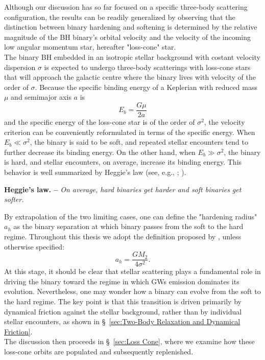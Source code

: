 \documentclass[12pt,twoside,openany]{book}
\begin{document}
\par\vspace{0.5cm}
\noindent
Although our discussion has so far focused on a specific three-body scattering configuration, the results can be readily generalized by observing that the distinction between binary hardening and softening is determined by the relative magnitude of the BH binary's orbital velocity  and the velocity of the incoming low angular momentum star, hereafter "loss-cone" star.\\The binary BH embedded in an isotropic stellar background with costant velocity dispersion $\sigma$ is expected to undergo three-body scatterings with loss-cone stars that will approach the galactic centre where the binary lives with velocity of the order of $\sigma$. Because the specific binding energy of a Keplerian with reduced mass $\mu$ and semimajor axis $a$ is
\begin{equation}
 E_b=\frac{G\mu}{2a}
\end{equation}
and the specific energy of the loss-cone star is of the order of $\sigma^2$, the velocity criterion can be conveniently reformulated in terms of the specific energy. When $E_b\ll \sigma^2$, the binary is said to be soft, and repeated stellar encounters tend to further decrease its binding energy. On the other hand, when $E_b\gg \sigma^2$, the binary is hard, and stellar encounters, on average, increase its binding energy. This behavior is well summarized by Heggie's law (see, e.g., \citealt{Heggie_1975}; \citealt{Heggie_1993}).
\medskip

\noindent\textbf{Heggie's law. --}
\emph{On average, hard binaries get harder and soft binaries get
softer.}
\medskip

\noindent By extrapolation of the two limiting cases, one can define the "hardening radius" $a_h$ as the binary separation at which binary passes from the soft to the hard regime. Throughout this thesis we adopt the definition proposed by \textcite{Quinlan_1996}, unless otherwise specified:\begin{equation}\label{a_h definition}
 a_h=\frac{GM_2}{4\sigma^2}.
\end{equation}
At this stage, it should be clear that stellar scattering plays a fundamental role in driving the binary toward the regime in which GWs emission dominates its evolution. Nevertheless, one may wonder how a binary can evolve from the soft to the hard regime. The key point is that this transition is driven primarily by dynamical friction against the stellar background, rather than by individual stellar encounters, as shown in \S~\ref{sec:Two-Body Relaxation and Dynamical Friction}.\\The discussion then proceeds in \S~\ref{sec:Loss Cone}, where we examine how these loss-cone orbits are populated and subsequently replenished.
\end{document}
